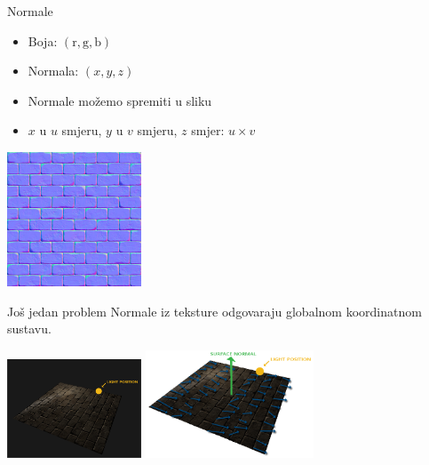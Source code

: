 \documentclass[9pt]{beamer}
\begin{document}
\begin{frame}{Normale}
	\begin{itemize}
		\item Boja: $(\mathrm{r}, \mathrm{g}, \mathrm{b})$
		\item Normala: $(x, y, z)$
		\item Normale možemo spremiti u sliku
		\item $x$ u $u$ smjeru, $y$ u $v$ smjeru, $z$ smjer: $u\times v$
	\end{itemize}
	
	\begin{center}
		\includegraphics[width=4cm]{slike/normal_mapping_normal_map.png}
	\end{center}
\end{frame}
\begin{frame}{Još jedan problem}
	Normale iz teksture odgovaraju globalnom koordinatnom sustavu.
	
	\begin{center}
		\includegraphics[width=4cm]{slike/normal_mapping_ground.png}
		\includegraphics[width=5cm]{slike/normal_mapping_ground_normals.png}
	\end{center}
\end{frame}
\end{document}
